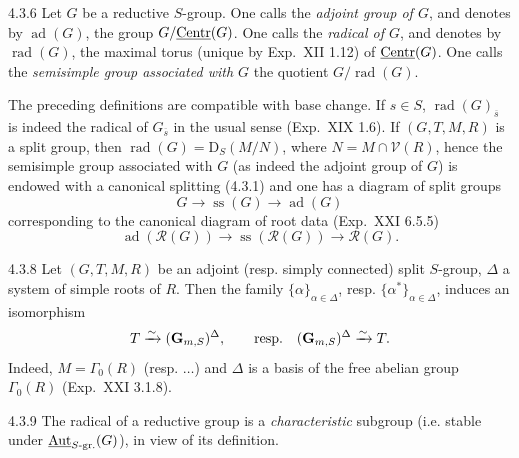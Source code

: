 \begin{definition}{4.3.6}\label{XXII.4.3.6}
Let $G$ be a reductive $S$-group. One calls the \emph{adjoint group of $G$}, and denotes by $\operatorname{ad}(G)$, the group $G/\underline{\mathrm{Centr}}(G)$. One calls the \emph{radical of $G$}, and denotes by $\operatorname{rad}(G)$, the maximal torus (unique by Exp.~XII 1.12) of $\underline{\mathrm{Centr}}(G)$. One calls the \emph{semisimple group associated with $G$} the quotient $G/\operatorname{rad}(G)$.
\end{definition}
The preceding definitions are compatible with base change. If $s\in S$, $\operatorname{rad}(G)_{\overline s}$ is indeed the radical of $G_{\overline s}$ in the usual sense (Exp.~XIX 1.6).
\label{XXII.4.3.7}
If $(G,T,M,R)$ is a split group, then $\operatorname{rad}(G)=\mathrm D_S(M/N)$, where $N=M\cap\mathcal V(R)$, hence the semisimple group associated with $G$ (as indeed the adjoint group of $G$) is endowed with a canonical splitting (4.3.1) and one has a diagram of split groups
\[
G\to\operatorname{ss}(G)\to\operatorname{ad}(G)
\]
corresponding to the canonical diagram of root data (Exp.~XXI 6.5.5)
\[
\operatorname{ad}(\mathscr R(G))\to\operatorname{ss}(\mathscr R(G))\to\mathscr R(G).
\]
\begin{remark}{4.3.8}\label{XXII.4.3.8}
Let $(G,T,M,R)$ be an adjoint (resp. simply connected) split $S$-group, $\Delta$ a system of simple roots of $R$. Then the family $\{\alpha\}_{\alpha\in\Delta}$, resp. $\{\alpha^*\}_{\alpha\in\Delta}$, induces an isomorphism
\[
T\xrightarrow{\sim}(\mathbf G_{m,S})^\Delta,\qquad\text{resp.}\quad(\mathbf G_{m,S})^\Delta\xrightarrow{\sim} T.
\]
Indeed, $M=\Gamma_0(R)$ (resp. $\ldots$) and $\Delta$ is a basis of the free abelian group $\Gamma_0(R)$ (Exp.~XXI 3.1.8).
\end{remark}
\begin{remark}{4.3.9}\label{XXII.4.3.9}
The radical of a reductive group is a \emph{characteristic} subgroup (i.e. stable under $\underline{\operatorname{Aut}}_{S\text{-gr.}}(G)$), in view of its definition.
\end{remark}

